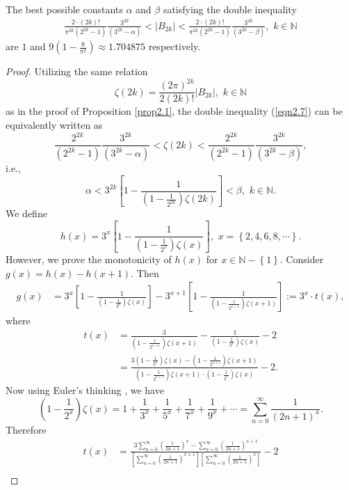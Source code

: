 \documentclass[eqnumis, pdf]{yjb}
\begin{document}
\begin{theorem}\label{thm2.6}
The best possible constants $ \alpha $ and $ \beta $ satisfying the double inequality
\begin{align}\label{eqn2.7}
\frac{2\cdot (2k)!}{\pi^{2k} (2^{2k}-1)}\frac{3^{2k}}{(3^{2k}-\alpha)} < \vert B_{2k} \vert < \frac{2\cdot (2k)!}{\pi^{2k} (2^{2k}-1)}\frac{3^{2k}}{(3^{2k}-\beta)}, \, \, k \in \mathbb{N}
\end{align}
are $ 1 $ and $ 9\left(1 - \frac{8}{\pi^2}\right) \approx 1.704875 $ respectively.
\end{theorem}
\begin{proof}
Utilizing the same relation
$$ \zeta(2k) = \frac{(2\pi)^{2k}}{2(2k)!} \vert B_{2k} \vert , \, \, k \in \mathbb{N} $$ as in the proof of Proposition \ref{prop2.1}, the double inequality (\ref{eqn2.7}) can be equivalently written as
$$ \frac{2^{2k}}{(2^{2k}-1)}\frac{3^{2k}}{(3^{2k}-\alpha)} < \zeta(2k) < \frac{2^{2k}}{(2^{2k}-1)}\frac{3^{2k}}{(3^{2k}-\beta)}, $$ i.e.,
$$ \alpha < 3^{2k}\left[1 - \frac{1}{\left(1-\frac{1}{2^{2k}}\right)\zeta(2k)}\right] < \beta , \, \, k \in \mathbb{N}. $$ 
We define $$ h(x) = 3^x \left[1 - \frac{1}{\left(1-\frac{1}{2^x}\right)\zeta(x)}\right], \, \, x = \left\lbrace 2, 4, 6, 8, \cdots \right\rbrace. $$ However, we prove the monotonicity of $ h(x) $ for $ x \in \mathbb{N} - \left\lbrace 1 \right\rbrace.$ Consider $ g(x) = h(x) - h(x+1).$ Then 
\begin{align*}
g(x) &= 3^x\left[1- \frac{1}{\left(1-\frac{1}{2^x}\right)\zeta(x)}\right] - 3^{x+1}\left[1- \frac{1}{\left(1-\frac{1}{2^{x+1}}\right)\zeta(x+1)}\right] := 3^x \cdot t(x),
\end{align*}
where
\begin{align*}
t(x) &= \frac{3}{\left(1-\frac{1}{2^{x+1}}\right)\zeta(x+1)} - \frac{1}{\left(1-\frac{1}{2^x}\right)\zeta(x)} - 2 \\
&= \frac{3\left(1-\frac{1}{2^x}\right)\zeta(x) - \left(1-\frac{1}{2^{x+1}}\right)\zeta(x+1) }{\left(1-\frac{1}{2^{x+1}}\right)\zeta(x+1) \cdot \left(1-\frac{1}{2^x}\right)\zeta(x)} - 2.
\end{align*}
Now using Euler's thinking \cite[p. 15]{gautschi}, we have $$ \left(1-\frac{1}{2^x}\right)\zeta(x) = 1 + \frac{1}{3^x} + \frac{1}{5^x} + \frac{1}{7^x} + \frac{1}{9^x} + \cdots = \sum_{n=0}^\infty \frac{1}{(2n+1)^x}.  $$
Therefore
\begin{align*}
t(x) &= \frac{3 \sum_{n=0}^\infty \left(\frac{1}{2n+1}\right)^x - \sum_{n=0}^\infty \left(\frac{1}{2n+1}\right)^{x+1}}{\left[\sum_{n=0}^\infty \left(\frac{1}{2n+1}\right)^{x+1}\right] \left[ \sum_{n=0}^\infty \left(\frac{1}{2n+1}\right)^x \right]} - 2 \\

\end{align*}
\end{proof}
\end{document}
